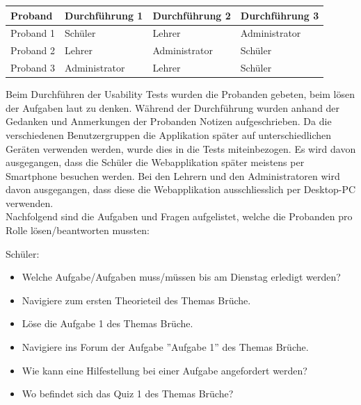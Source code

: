 \begin{table}[h]
	\centering
	\begin{tabu} to 0.9\textwidth {l X X X}
	\toprule
		Proband & Durchführung 1 & Durchführung 2 & Durchführung 3 \\ 
	\midrule
		Proband 1 & Schüler & Lehrer & Administrator \\
		Proband 2 & Lehrer & Administrator & Schüler \\
		Proband 3 & Administrator & Lehrer & Schüler \\
	\bottomrule
	\end{tabu}
	\label{Usability Test Rollen}
\end{table}


Beim Durchführen der Usability Tests wurden die Probanden gebeten, beim lösen der Aufgaben laut zu denken. Während der Durchführung wurden anhand der Gedanken und Anmerkungen der Probanden Notizen aufgeschrieben. Da die verschiedenen Benutzergruppen die Applikation später auf unterschiedlichen Geräten verwenden werden, wurde dies in die Tests miteinbezogen. Es wird davon ausgegangen, dass die Schüler die Webapplikation später meistens per Smartphone besuchen werden. Bei den Lehrern und den Administratoren wird davon ausgegangen, dass diese die Webapplikation ausschliesslich per Desktop-PC verwenden. \\

Nachfolgend sind die Aufgaben und Fragen aufgelistet, welche die Probanden pro Rolle lösen/beantworten mussten:

Schüler: \\
\begin{itemize}
	\item Welche Aufgabe/Aufgaben muss/müssen bis am Dienstag erledigt werden?
	\item Navigiere zum ersten Theorieteil des Themas Brüche.
	\item Löse die Aufgabe 1 des Themas Brüche.
	\item Navigiere ins Forum der Aufgabe ''Aufgabe 1'' des Themas Brüche.
	\item Wie kann eine Hilfestellung bei einer Aufgabe angefordert werden?
	\item Wo befindet sich das Quiz 1 des Themas Brüche?
\end{itemize}


